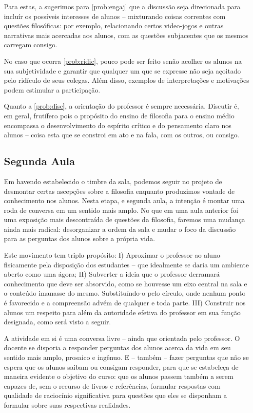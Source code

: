 \documentclass[12pt,a4paper]{article}
\begin{document}
	Para estas, a sugerimos para \ref{prob:engaj} que a discussão
	seja direcionada para incluír os possíveis interesses de alunos
	-- mixturando coisas correntes com questões filosóficas: por
	exemplo, relacionando certos video-jogos e outras narrativas 
	mais acercadas aos alunos, com as questões subjacentes que os 
	mesmos carregam consigo. 
	
	No caso que ocorra \ref{prob:ridic}, pouco pode ser feito senão
	acolher os alunos na sua subjetividade e garantir que qualquer 
	um que se expresse não seja açoitado pelo ridículo de seus 
	colegas. Além disso, exemplos de interpretações e motivações 
	podem estimular a participação.

	Quanto a \ref{prob:disc}, a orientação do professor é sempre
	necessária. Discutir é, em geral, frutífero pois o propósito
	do ensino de filosofia para o ensino médio encompassa o 
	desenvolvimento do espírito crítico e do pensamento claro nos 
	alunos -- coisa esta que se constroi em ato e na fala, com os 
	outros, ou consigo.

	\subsection*{Segunda Aula}

	Em havendo estabelecido o timbre da sala, podemos seguir no 
	projeto de desmontar certas ascepções sobre a filosofia 
	enquanto produzimos vontade de conhecimento nos alunos. Nesta
	etapa, e segunda aula, a intenção é montar uma roda de conversa
	em um sentido mais amplo. No que em uma aula anterior foi uma 
	exposição mais descontraída de questões da filosofia, faremos 
	uma mudança ainda mais radical: desorganizar a ordem da sala e 
	mudar o foco da discussão para as perguntas dos alunos sobre 
	a própria vida. 

	Este movimento tem triplo propósito: I) Aproximar o 
	professor ao aluno fisicamente pela disposição dos 
	estudantes -- que idealmente se daria um ambiente aberto como 
	uma ágora; II) Subverter a ideia que o professor 
	derramará conhecimento que deve ser absorvido, como se houvesse
	um eixo central na sala e o conteúdo imanasse do mesmo. 
	Substituíndo-o pelo círculo, onde nenhum ponto é favorecido e 
	a compreensão advém de qualquer e toda parte. III) 
	Construir nos alunos um respeito para além da autoridade efetiva
	do professor em sua função designada, como será visto a seguir.

	A atividade em si é uma conversa livre -- ainda que orientada 
	pelo professor. O docente se disporia a responder perguntas dos 
	alunos acerca da vida em seu sentido mais amplo, prosaico e 
	ingênuo. E -- também -- fazer perguntas que não se espera que 
	os alunos saibam ou consigam responder, para que se estabeleça 
	de maneira evidente o objetivo do curso: que os alunos passem 
	também a serem capazes de, sem o recurso de livros e referências,
	formular respostas com qualidade de raciocínio significativa 
	para questões que eles se disponham a formular sobre suas 
	respectivas realidades.
	
\end{document}

